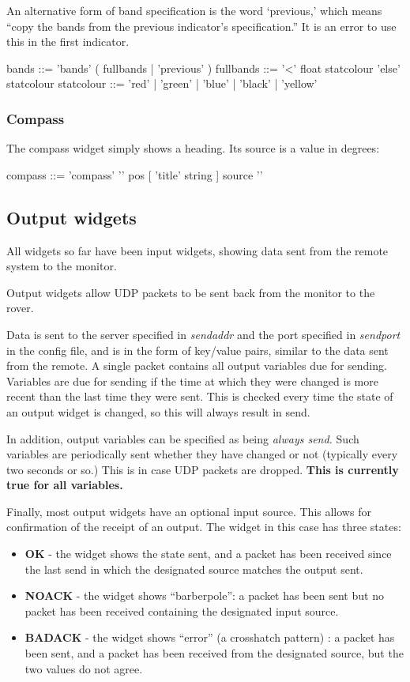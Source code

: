An alternative form of band specification is the word `previous,'
which means ``copy the bands from the previous indicator's
specification.'' It is an error to use this in the first indicator.
\begin{v}
bands       ::= 'bands' ( fullbands | 'previous' )
fullbands   ::= { '<' float statcolour }
                'else' statcolour
statcolour  ::= 'red' | 'green' | 'blue' | 'black' | 'yellow'
\end{v}
               
\subsubsection{Compass}
The compass widget simply shows a heading. Its source is a value
in degrees:
\begin{v}
compass     ::= 'compass' '{'
                pos 
                [ 'title' string ]
                source
                '}'
\end{v}


\subsection{Output widgets}
All widgets so far have been input widgets, showing data
sent from the remote system to the monitor.

Output widgets allow UDP packets to be sent back from the monitor
to the rover.

Data is sent to the server specified in \emph{sendaddr} and
the port specified in \emph{sendport} in the config file, and
is in the form of key/value pairs, similar to the data sent
from the remote. A single packet contains all output variables
due for sending. Variables are due for sending if the time
at which they were changed is more recent than the last time
they were sent. This is checked every time the state of an output
widget is changed, so this will always result in send.

In addition, output variables can be specified as being \emph{always send.}
Such variables are periodically sent whether they have changed 
or not (typically every two seconds or so.) This is in case
UDP packets are dropped. \textbf{This is currently true for all variables.} 

Finally, most output widgets have an optional input source. This
allows for confirmation of the receipt of an output. The widget
in this case has three states:
\begin{itemize}
\item \textbf{OK} - the widget shows the state sent, and a packet has been
received since the last send in which the designated source
matches the output sent.
\item \textbf{NOACK} - the widget shows ``barberpole'': a packet
has been sent but no packet has been received containing the designated input source.
\item \textbf{BADACK} - the widget shows ``error'' (a crosshatch
pattern) : a packet has been sent, and a packet has been received from
the designated source, but the two values do not agree.
\end{itemize}


